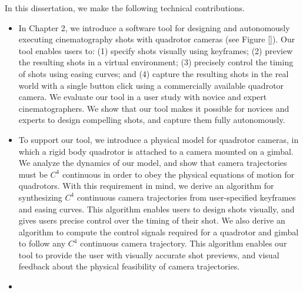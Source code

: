 In this dissertation, we make the following technical contributions.

\begin{itemize}

\item

In Chapter 2, we introduce a software tool for designing and autonomously executing cinematography shots with quadrotor cameras (see Figure \ref{}).
Our tool enables users to: (1) specify shots visually using keyframes; (2) preview the resulting shots in a virtual environment; (3) precisely control the timing of shots using easing curves; and (4) capture the resulting shots in the real world with a single button click using a commercially available quadrotor camera.
We evaluate our tool in a user study with novice and expert cinematographers.
We show that our tool makes it possible for novices and experts to design compelling shots, and capture them fully autonomously.

\item 

To support our tool, we introduce a physical model for quadrotor cameras, in which a rigid body quadrotor is attached to a camera mounted on a gimbal.
We analyze the dynamics of our model, and show that camera trajectories must be $C^4$ continuous in order to obey the physical equations of motion for quadrotors.
With this requirement in mind, we derive an algorithm for synthesizing $C^4$ continuous camera trajectories from user-specified keyframes and easing curves.
This algorithm enables users to design shots visually, and gives users precise control over the timing of their shot.
We also derive an algorithm to compute the control signals required for a quadrotor and gimbal to follow any $C^4$ continuous camera trajectory.
This algorithm enables our tool to provide the user with visually accurate shot previews, and visual feedback about the physical feasibility of camera trajectories.

\item


\end{itemize}
